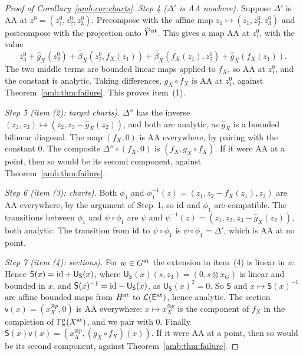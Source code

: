 \begin{proof}[Proof of Corollary~\ref{amb:cor:charts}]
\emph{Step 4 ($\Delta'$ is AA nowhere).} Suppose $\Delta'$ is AA at $z^0=(z^0_1,z^0_2,z^0_3)$. Precompose with the affine map $z_1\mapsto(z_1,z^0_2,z^0_3)$ and postcompose with the projection onto $\widehat Y^{\rm at}$. This gives a map AA at $z^0_1$, with the value
\[
 z^0_3+\hat g_X(z^0_2)+\hat\beta_X(z^0_2,f_X(z_1))+\hat\beta_X(f_X(z_1),z^0_2)+\hat g_X(f_X(z_1)).
\]
The two middle terms are bounded linear maps applied to $f_X$, so AA at $z^0_1$, and the constant is analytic. Taking differences, $g_X\circ f_X$ is AA at $z^0_1$, against Theorem~\ref{amb:thm:failure}. This proves item~(1).

\emph{Step 5 (item (2): target charts).} $\Delta''$ has the inverse $(z_2,z_3)\mapsto(z_2,z_3-\hat g_X(z_2))$, and both are analytic, as $\hat g_X$ is a bounded bilinear diagonal. The map $(f_X,0)$ is AA everywhere, by pairing with the constant $0$. The composite $\Delta''\circ(f_X,0)$ is $(f_X,g_X\circ f_X)$. If it were AA at a point, then so would be its second component, against Theorem~\ref{amb:thm:failure}.

\emph{Step 6 (item (3): charts).} Both $\phi_1$ and $\phi_1^{-1}(z)=(z_1,z_2-f_X(z_1),z_3)$ are AA everywhere, by the argument of Step~1, so $\mathrm{id}$ and $\phi_1$ are compatible. The transitions between $\phi_1$ and $\psi\circ\phi_1$ are $\psi$ and $\psi^{-1}(z)=(z_1,z_2,z_3-\hat g_X(z_2))$, both analytic. The transition from $\mathrm{id}$ to $\psi\circ\phi_1$ is $\psi\circ\phi_1=\Delta'$, which is AA at no point.

\emph{Step 7 (item (4): sections).} For $w\in G^{\rm at}$ the extension in item~(4) is linear in $w$. Hence $\mathsf S(x)=\mathrm{id}+\mathsf U_{\mathsf S}(x)$, where $\mathsf U_{\mathsf S}(x)(s,z_3)=(0,s\otimes x_G)$ is linear and bounded in $x$, and $\mathsf S(x)^{-1}=\mathrm{id}-\mathsf U_{\mathsf S}(x)$, as $\mathsf U_{\mathsf S}(x)^2=0$. So $\mathsf S$ and $x\mapsto\mathsf S(x)^{-1}$ are affine bounded maps from $H^{\rm at}$ to $\mathcal L(\mathsf E^{\rm at})$, hence analytic. The section $\mathsf v(x)=(x_X^{\otimes p},0)$ is AA everywhere: $x\mapsto x_X^{\otimes p}$ is the component of $f_X$ in the completion of $\Gamma^p_\pi(X^{\rm at})$, and we pair with $0$. Finally $\mathsf S(x)\mathsf v(x)=(x_X^{\otimes p},(g_X\circ f_X)(x))$. If it were AA at a point, then so would be its second component, against Theorem~\ref{amb:thm:failure}.
\end{proof}
